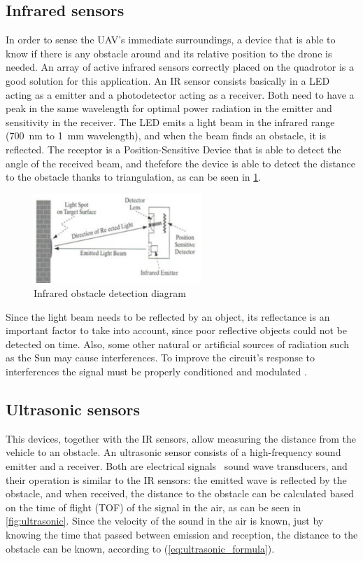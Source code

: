 \documentclass[journal]{IEEEtran}
\begin{document}
		\subsection{Infrared sensors}
		In order to sense the UAV's immediate surroundings, a device that is able to know if there is any obstacle around and its relative position to the drone is needed. An array of active infrared sensors correctly placed on the quadrotor is a good solution for this application. An IR sensor consists basically in a LED acting as a emitter and a photodetector acting as a receiver. Both need to have a peak in the same wavelength for optimal power radiation in the emitter and sensitivity in the receiver. The LED emits a light beam in the infrared range (\SI{700}{\nano \meter} to \SI{1}{\milli \meter} wavelength), and when the beam finds an obstacle, it is reflected. The receptor is a Position-Sensitive Device that is able to detect the angle of the received beam, and thefefore the device is able to detect the distance to the obstacle thanks to triangulation, as can be seen in \figurename\ref{fig:ir}.
		\begin{figure}[h]
			\centering
			\includegraphics[width=2.5in]{ir}
			\caption{Infrared obstacle detection diagram}
			\label{fig:ir}
		\end{figure}
		Since the light beam needs to be reflected by an object, its reflectance is an important factor to take into account, since poor reflective objects could not be detected on time.  Also, some other natural or artificial sources of radiation such as the Sun may cause interferences. To improve the circuit's response to interferences the signal must be properly conditioned and modulated \cite{mod_control_bresciani, remotecontrol}.
		
		\subsection{Ultrasonic sensors}
		This devices, together with the IR sensors, allow measuring the distance from the vehicle to an obstacle. An ultrasonic sensor consists of a high-frequency sound emitter and a receiver. Both are electrical signals \textendash \ sound wave transducers, and their operation is similar to the IR sensors: the emitted wave is reflected by the obstacle, and when received, the distance to the obstacle can be calculated based on the time of flight (TOF) of the signal in the air, as can be seen in \figurename \ref{fig:ultrasonic}. Since the velocity of the sound in the air is known, just by knowing the time that passed between emission and reception, the distance to the obstacle can be known, according to (\ref{eq:ultrasonic_formula}). 
		
\end{document}

